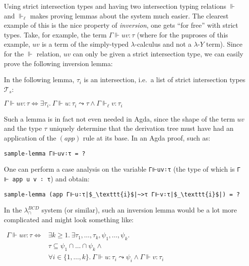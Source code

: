 \documentclass[a4paper, 12pt, twoside]{style/ociamthesis}
\theoremstyle{plain}
\theoremstyle{definition}
\newtheorem{Lemma}{Lemma}[chapter]
\theoremstyle{remark}
\newtheorem*{Remark}{Remark}
\newcommand{\lamy}{\lambda\text{-}Y}
\renewenvironment{Remark}{\begin{OldRemark}\begin{mdframed}[style=example, linecolor=black]}{\end{mdframed}\end{OldRemark}}
\renewenvironment{Lemma}{\begin{OldLemma}\begin{mdframed}[style=example, linecolor=cyan]}{\end{mdframed}\end{OldLemma}}
\begin{document}
\begin{Remark}

Using strict intersection types and having two intersection typing
relations \(\Vdash\) and \(\Vdash_\ell\) makes proving lemmas about the
system much easier. The clearest example of this is the nice property of
\emph{inversion}, one gets ``for free'' with strict types. Take, for
example, the term \(\Gamma \Vdash uv : \tau\) (where for the puproses of
this example, \(uv\) is a term of the simply-typed \(\lambda\)-calculus
and not a \(\lamy\) term). Since for the \(\Vdash\) relation, \(uv\) can
only be given a strict intersection type, we can easily prove the
following inversion lemma:

\begin{Lemma}[Inversion Lemma for $(app)$]

\label{Lemma:invApp} In the following lemma, \(\tau_i\) is an
intersection, i.e.~a list of strict intersection types
\(\mathcal{T}_s\):

\begin{center}
$\Gamma \Vdash uv : \tau \iff \exists \tau_i.\ \Gamma \Vdash u : \tau_i \leadsto \tau \land \Gamma \Vdash_\ell v : \tau_i$
\end{center}

\end{Lemma}

Such a lemma is in fact not even needed in Agda, since the shape of the
term \(uv\) and the type \(\tau\) uniquely determine that the derivation
tree must have had an application of the \((app)\) rule at its base. In
an Agda proof, such as:

\begin{verbatim}
sample-lemma Γ⊩uv∶τ = ?
\end{verbatim}

One can perform a case analysis on the variable \texttt{Γ⊩uv∶τ} (the
type of which is \texttt{Γ ⊩ app u v ∶ τ}) and obtain:

\begin{verbatim}
sample-lemma (app Γ⊩u∶τ|$_\texttt{i}$|~>τ Γ⊩v∶τ|$_\texttt{i}$|) = ?
\end{verbatim}

In the \(\lambda_\cap^{BCD}\) system (or similar), such an inversion
lemma would be a lot more complicated and might look something like:

\begin{center}
$\begin{aligned}
\Gamma \Vdash uv : \tau \iff &\exists k \geq 1.\ \exists \tau_1,\hdots,\tau_k,\psi_1,\hdots,\psi_k.\\
&\tau \subseteq \psi_1 \cap \hdots \cap \psi_k \land\\
&\forall i \in \{1,\hdots,k\}.\ \Gamma \Vdash u : \tau_i \leadsto \psi_i \land \Gamma \Vdash v : \tau_i
\end{aligned}$
\end{center}


\end{Remark}
\end{document}
